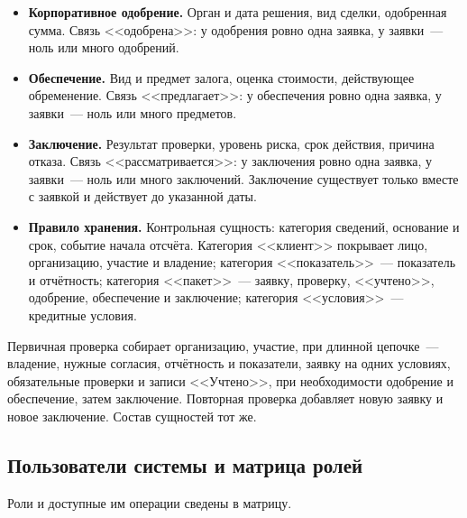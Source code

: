 \begin{itemize}
\item \textbf{Корпоративное одобрение.} Орган и дата решения, вид сделки, одобренная сумма. Связь <<одобрена>>: у одобрения ровно одна заявка, у заявки~--- ноль или много одобрений.
\item \textbf{Обеспечение.} Вид и предмет залога, оценка стоимости, действующее обременение. Связь <<предлагает>>: у обеспечения ровно одна заявка, у заявки~--- ноль или много предметов.
\item \textbf{Заключение.} Результат проверки, уровень риска, срок действия, причина отказа. Связь <<рассматривается>>: у заключения ровно одна заявка, у заявки~--- ноль или много заключений. Заключение существует только вместе с заявкой и действует до указанной даты.
\item \textbf{Правило хранения.} Контрольная сущность: категория сведений, основание и срок, событие начала отсчёта. Категория <<клиент>> покрывает лицо, организацию, участие и владение; категория <<показатель>>~--- показатель и отчётность; категория <<пакет>>~--- заявку, проверку, <<учтено>>, одобрение, обеспечение и заключение; категория <<условия>>~--- кредитные условия.
\end{itemize}

Первичная проверка собирает организацию, участие, при длинной цепочке~--- владение, нужные согласия, отчётность и показатели, заявку на одних условиях, обязательные проверки и записи <<Учтено>>, при необходимости одобрение и обеспечение, затем заключение. Повторная проверка добавляет новую заявку и новое заключение. Состав сущностей тот же.

\subsection{Пользователи системы и матрица ролей}

Роли и доступные им операции сведены в матрицу.

